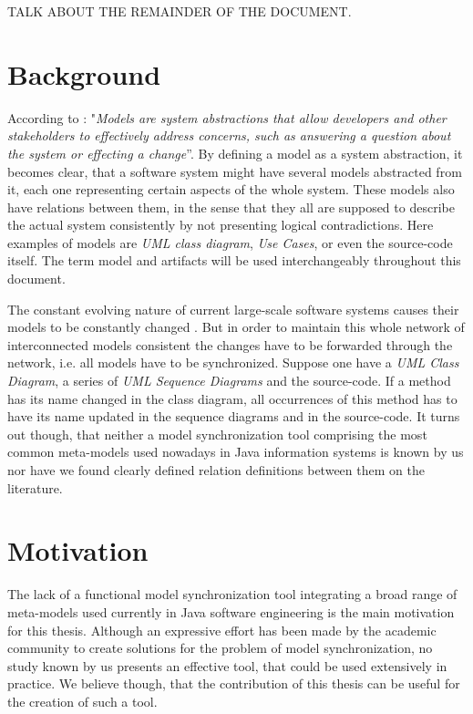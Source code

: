 \documentclass[tuberlin,cic,tc,english,noabntcite]{iiufrgs}
\begin{document}
TALK ABOUT THE REMAINDER OF THE DOCUMENT.

\section{Background}
According to \citet[p. 21]{czarnecki2006feature}: "\textit{Models are system abstractions that allow developers and other stakeholders to effectively address concerns, such as answering a question about the system or effecting a change}”. By defining a model as a system abstraction, it becomes clear, that a software system might have several models abstracted from it, each one representing certain aspects of the whole system. These models also have relations between them, in the sense that they all are supposed to describe the actual system consistently by not presenting logical contradictions. Here examples of models are \emph{UML class diagram}, \emph{Use Cases}, or even the source-code itself. The term model and artifacts will be used interchangeably throughout this document.

The constant evolving nature of current large-scale software systems causes their models to be constantly changed \cite{diskin2011model}. But in order to maintain this whole network of interconnected models consistent the changes have to be forwarded through the network, i.e. all models have to be synchronized. Suppose one have a \emph{UML Class Diagram}, a series of \emph{UML Sequence Diagrams} and the source-code. If a method has its name changed in the class diagram, all occurrences of this method has to have its name updated in the sequence diagrams and in the source-code. It turns out though, that neither a model synchronization tool comprising the most common meta-models used nowadays in Java information systems is known by us nor have we found clearly defined relation definitions between them on the literature. 

\section{Motivation}
The lack of a functional model synchronization tool integrating a broad range of meta-models used currently in Java software engineering is the main motivation for this thesis. Although an expressive effort has been made by the academic community to create solutions for the problem of model synchronization, no study known by us presents an effective tool, that could be used extensively in practice. We believe though, that the contribution of this thesis can be useful for the creation of such a tool.
	
\end{document}
